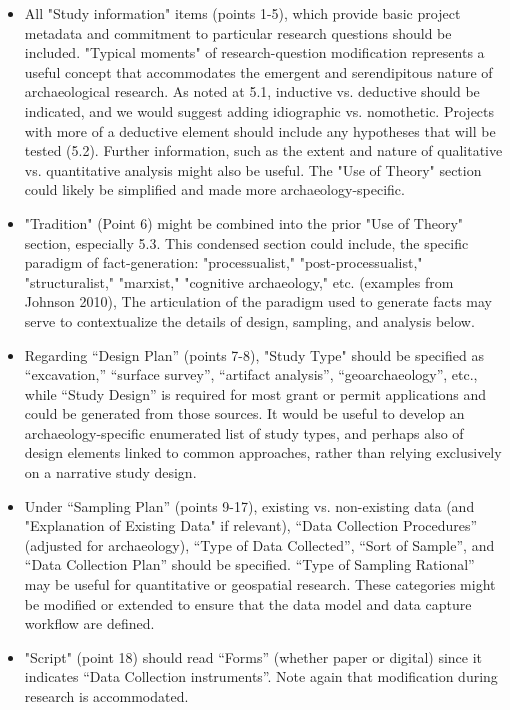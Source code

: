 \documentclass[article]{sa}
\begin{document}
\begin{itemize}
\item  All "Study information" items (points 1-5), which provide basic
  project metadata and commitment to particular research questions
  should be included. "Typical moments" of research-question
  modification represents a useful concept that accommodates the
  emergent and serendipitous nature of archaeological research. As noted
  at 5.1, inductive vs. deductive should be indicated, and we would
  suggest adding idiographic vs. nomothetic. Projects with more of a
  deductive element should include any hypotheses that will be tested
  (5.2). Further information, such as the extent and nature of
  qualitative vs. quantitative analysis might also be useful. The "Use
  of Theory" section could likely be simplified and made more
  archaeology-specific.
\item   "Tradition" (Point 6) might be combined into the prior "Use of Theory"
  section, especially 5.3. This condensed section could include, the
  specific paradigm of fact-generation: "processualist,"
  "post-processualist," "structuralist," "marxist," "cognitive
  archaeology," etc. (examples from Johnson 2010), The articulation of
  the paradigm used to generate facts may serve to contextualize the
  details of design, sampling, and analysis below.
 \item  Regarding ``Design Plan'' (points 7-8), "Study Type" should be
  specified as ``excavation,'' ``surface survey'', ``artifact
  analysis'', ``geoarchaeology'', etc., while ``Study Design'' is
  required for most grant or permit applications and could be generated
  from those sources. It would be useful to develop an
  archaeology-specific enumerated list of study types, and perhaps also
  of design elements linked to common approaches, rather than relying
  exclusively on a narrative study design.
 
\item   Under ``Sampling Plan'' (points 9-17), existing vs. non-existing data
  (and "Explanation of Existing Data" if relevant), ``Data Collection
  Procedures'' (adjusted for archaeology), ``Type of Data Collected'',
  ``Sort of Sample'', and ``Data Collection Plan'' should be specified.
  ``Type of Sampling Rational'' may be useful for quantitative or
  geospatial research. These categories might be modified or extended to
  ensure that the data model and data capture workflow are defined.

\item   "Script" (point 18) should read ``Forms'' (whether paper or digital)
  since it indicates ``Data Collection instruments''. Note again that
  modification during research is accommodated.


\end{itemize}
\end{document}
